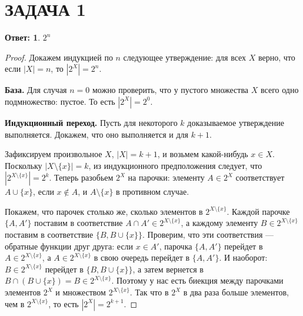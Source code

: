 \documentclass[a4paper]{article}
\theoremstyle{dotless}
\newtheorem*{answer}{Ответ:}
\begin{document}
\section*{ЗАДАЧА 1}

\begin{answer}
$2^n$
\end{answer}
\begin{proof}
Докажем индукцией по $n$ следующее утверждение: для всех $X$ верно, что если $|X|=n$, то $|2^X|=2^n$.

{\bf База.} Для случая $n=0$ можно проверить, что у пустого множества $X$ всего одно подмножество: пустое. То есть $|2^X|=2^0$.

{\bf Индукционный переход.} Пусть для некоторого $k$ доказываемое утверждение выполняется. Докажем, что оно выполняется и для $k+1$.

Зафиксируем произвольное $X$, $|X|=k+1$, и возьмем какой-нибудь $x\in X$. Поскольку $|X\setminus \{x\}| = k$, из индукционного предположения следует, что $|2^{X\setminus \{x\}}|=2^k$. Теперь разобьем $2^X$ на парочки: элементу $A\in 2^X$ соответствует $A\cup \{x\}$, если $x\not\in A$, и $A\setminus \{x\}$ в противном случае. 

Покажем, что парочек столько же, сколько элементов в $2^{X\setminus \{x\}}$. Каждой парочке $\{A, A'\}$ поставим в соответствие $A\cap A'\in 2^{X\setminus \{x\}}$, а каждому элементу $B \in 2^{X\setminus \{x\}}$ поставим в соответствие $\{B, B\cup \{x\}\}$. Проверим, что эти соответствия --- обратные функции друг друга:  если $x\in A'$, парочка $\{A, A'\}$ перейдет в $A\in 2^{X\setminus \{x\}}$, а $A\in 2^{X\setminus \{x\}}$ в свою очередь перейдет в $\{A, A'\}$. И наоборот: $B \in 2^{X\setminus \{x\}}$ перейдет в $\{B, B\cup\{x\}\}$, а затем вернется в $B\cap (B\cup\{x\})=B\in 2^{X\setminus \{x\}}$. Поэтому у нас есть биекция между парочками элементов $2^X$ и множеством $2^{X\setminus \{x\}}$. Так что в $2^X$ в два раза больше элементов, чем в $2^{X\setminus \{x\}}$, то есть $|2^X|=2^{k+1}$.
\end{proof}
\end{document}
